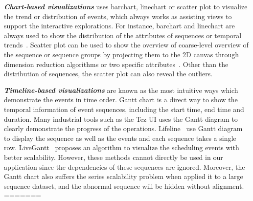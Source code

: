 \emph{\textbf{Chart-based visualizations}} uses barchart, linechart or scatter plot to visualize the trend or distribution of events, which always works as assisting views to support the interactive explorations. For instance, barchart and linechart are always used to show the distribution of the attributes of sequences or temporal trends~\cite{gotz2019visual, cappers2017exploring}. Scatter plot can be used to show the overview of coarse-level overview of the sequence or sequence groups by projecting them to the 2D canvas through dimension reduction algorithms or two specific attributes~\cite{wu2020visual, malik2016high, gotz2019visual}. Other than the distribution of sequences, the scatter plot can also reveal the outliers. 

\emph{\textbf{Timeline-based visualizations}} are known as the most intuitive ways which demonstrate the events in time order. Gantt chart is a direct way to show the temporal information of event sequences, including the start time, end time and duration. Many industrial tools such as the Tez UI uses the Gantt diagram to clearly demonstrate the progress of the operations. Lifeline~\cite{plaisant1996lifelines} use Gantt diagram to display the sequence as well as the events and each sequence takes a single row. LiveGantt~\cite{jo2014livegantt} proposes an algorithm to visualize the scheduling events with better scalability. However, these methods cannot directly be used in our application since the dependencies of these sequences are ignored. Moreover, the Gantt chart also suffers the series scalability problem when applied it to a large sequence dataset, and the abnormal sequence will be hidden without alignment.
=======

%
%

